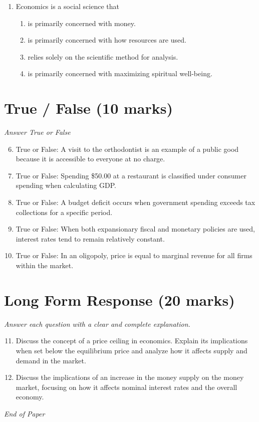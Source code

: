 \documentclass[12pt]{article}
\begin{document}
\begin{enumerate}[label=\arabic*.]
\begin{enumerate}[label=(\alph*)]
    \item A higher price.
    \item A lower level of output.
\end{enumerate}
\item Economics is a social science that
\begin{enumerate}[label=(\alph*)]
    \item is primarily concerned with money.
    \item is primarily concerned with how resources are used.
    \item relies solely on the scientific method for analysis.
    \item is primarily concerned with maximizing spiritual well-being.
\end{enumerate}
\end{enumerate}

\section*{True / False (10 marks)}
\textit{Answer True or False}
\begin{enumerate}[label=\arabic*.]
\setcounter{enumi}{5}
\item True or False: A visit to the orthodontist is an example of a public good because it is accessible to everyone at no charge.
\item True or False: Spending \$50.00 at a restaurant is classified under consumer spending when calculating GDP.
\item True or False: A budget deficit occurs when government spending exceeds tax collections for a specific period.
\item True or False: When both expansionary fiscal and monetary policies are used, interest rates tend to remain relatively constant.
\item True or False: In an oligopoly, price is equal to marginal revenue for all firms within the market.
\end{enumerate}

\section*{Long Form Response (20 marks)}
\textit{Answer each question with a clear and complete explanation.}
\begin{enumerate}[label=\arabic*.]
\setcounter{enumi}{10}
\item Discuss the concept of a price ceiling in economics. Explain its implications when set below the equilibrium price and analyze how it affects supply and demand in the market.
\item Discuss the implications of an increase in the money supply on the money market, focusing on how it affects nominal interest rates and the overall economy.
\end{enumerate}

\vfill
\noindent\textit{End of Paper}
\end{document}
